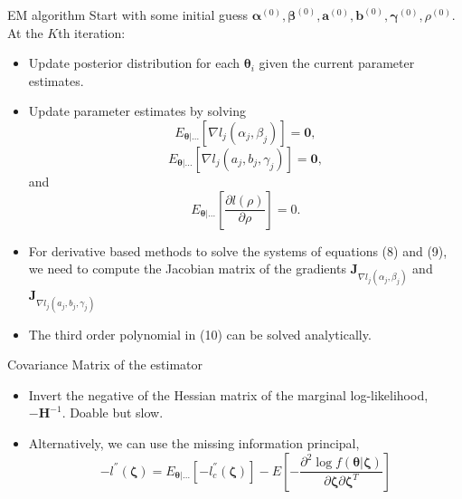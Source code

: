 \documentclass[xcolor=dvipsnames,12pt]{beamer}
\begin{document}
  \begin{frame}{EM algorithm}
    Start with some initial guess $\bm{\alpha}^{(0)}, \bm{\beta}^{(0)}, \bm{a}^{(0)}, \bm{b}^{(0)}, \bm{\gamma}^{(0)}, \rho^{(0)}$.
    At the $K$th iteration:
    \begin{itemize}
      \item Update posterior distribution for each $\bm{\theta}_i$ given the current parameter estimates.
      \item Update parameter estimates by solving
      \begin{equation}
        E_{\bm{\theta}|\dots}[\nabla l_j(\alpha_j, \beta_j)] = \bm{0},
      \end{equation}
      \begin{equation}
        E_{\bm{\theta}|\dots}[\nabla l_j(a_j, b_j, \gamma_j)] = \bm{0},
      \end{equation}
      and
      \begin{equation}
        E_{\bm{\theta}|\dots}[\frac{\partial l(\rho)}{\partial \rho}] = 0.
      \end{equation}
    \end{itemize}
  \end{frame}

  \begin{frame}
  \begin{itemize}
    \item For derivative based methods to solve the systems of equations (8) and (9), we need to compute the Jacobian matrix of the gradients $\bm{J}_{\nabla l_j(\alpha_j, \beta_j)}$ and $\bm{J}_{\nabla l_j(a_j, b_j, \gamma_j)}$
    \item The third order polynomial in (10) can be solved analytically.
  \end{itemize}
  \end{frame}

  \begin{frame}{Covariance Matrix of the estimator}
    \begin{itemize}
      \item Invert the negative of the Hessian matrix of the marginal log-likelihood, $-\bm{H}^{-1}$. Doable but slow.
      \item Alternatively, we can use the missing information principal,
      \begin{equation}
      -l^{''}(\bm{\zeta}) = E_{\bm{\theta}|\dots}[-l_{c}^{''}(\bm{\zeta})] - E\left[-\frac{\partial^2 \log f(\bm{\theta}|\bm{\zeta})}{\partial \bm{\zeta} \partial \bm{\zeta}^T}\right]
      \end{equation}
    \end{itemize}
  \end{frame}
  
\end{document}
